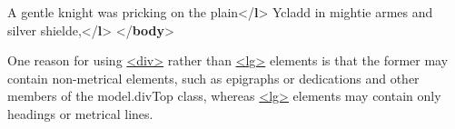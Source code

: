 \begin{shaded}
\hspace*{1em}\hspace*{1em}\hspace*{1em}A gentle knight was pricking on the plain{</\textbf{l}>}\mbox{}\newline 
\hspace*{1em}\hspace*{1em}\hspace*{1em}Ycladd in mightie armes and silver shielde,{</\textbf{l}>}\mbox{}\newline 
\hspace*{1em}\hspace*{1em}\mbox{}\newline 
\hspace*{1em}\mbox{}\newline 
{}\mbox{}\newline 
{</\textbf{body}>}\end{shaded}\egroup\par \par
One reason for using \hyperref[TEI.div]{<div>} rather than \hyperref[TEI.lg]{<lg>} elements is that the former may contain non-metrical elements, such as epigraphs or dedications and other members of the \textsf{model.divTop} class, whereas \hyperref[TEI.lg]{<lg>} elements may contain only headings or metrical lines.
